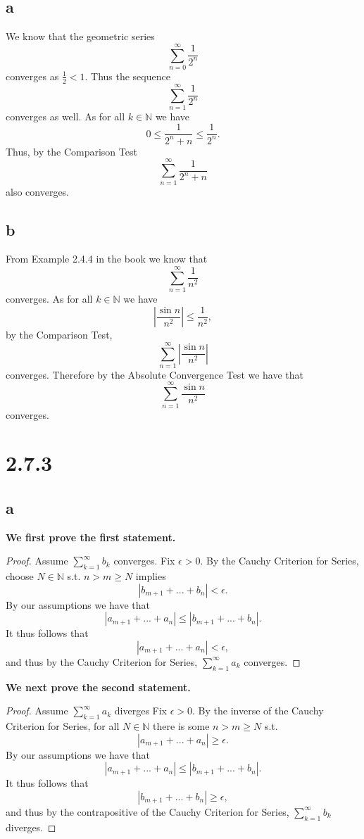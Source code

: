 \documentclass[10pt]{article}
\begin{document}
\subsection*{a}
We know that the geometric series 
\[\sum_{n=0}^\infty \frac{1}{2^n}\]
converges as $\frac{1}{2}<1.$ Thus the sequence
\[\sum_{n=1}^\infty \frac{1}{2^n}\]
converges as well.
As for all $k\in\mathbb{N}$ we have
\[0\le\frac{1}{2^n+n}\le\frac{1}{2^n}.\]
Thus, by the Comparison Test 
\[\sum_{n=1}^\infty\frac{1}{2^n+n}\]
also converges.
\subsection*{b}
From Example 2.4.4 in the book we know that
\[\sum_{n=1}^\infty \frac{1}{n^2}\]
converges. As for all $k\in\mathbb{N}$ we have
\[\left | \frac{\sin n}{n^2} \right | \le \frac{1}{n^2},\]
by the Comparison Test,
\[\sum_{n=1}^\infty \left | \frac{\sin n}{n^2} \right |\]
converges. Therefore by the Absolute Convergence Test we have that
\[\sum_{n=1}^\infty  \frac{\sin n}{n^2} \]
converges.

\section*{2.7.3}
\subsection*{a}

\textbf{We first prove the first statement.}
\begin{proof}
    Assume $\sum_{k=1}^\infty b_k$ converges. Fix $\epsilon > 0.$ By the Cauchy Criterion for Series, choose $N\in \mathbb{N}$ s.t. $n>m\ge N$ implies
    \[|b_{m+1}+...+b_n|<\epsilon.\]
    By our assumptions we have that
    \[|a_{m+1}+...+a_n|\le|b_{m+1}+...+b_n|.\]
    It thus follows that
    \[|a_{m+1}+...+a_n|<\epsilon,\]
    and thus by the Cauchy Criterion for Series, $\sum_{k=1}^\infty a_k$ converges.
\end{proof}

\noindent
\textbf{We next prove the second statement.}
\begin{proof}
    Assume $\sum_{k=1}^\infty a_k$ diverges Fix $\epsilon > 0.$ By the inverse of the Cauchy Criterion for Series, for all $N\in \mathbb{N}$  there is some $n>m\ge N$ s.t.
    \[|a_{m+1}+...+a_n|\ge\epsilon.\]
    By our assumptions we have that
    \[|a_{m+1}+...+a_n|\le|b_{m+1}+...+b_n|.\]
    It thus follows that
    \[|b_{m+1}+...+b_n|\ge\epsilon,\]
    and thus by the contrapositive of the Cauchy Criterion for Series, $\sum_{k=1}^\infty b_k$ diverges.
\end{proof}
\end{document}
